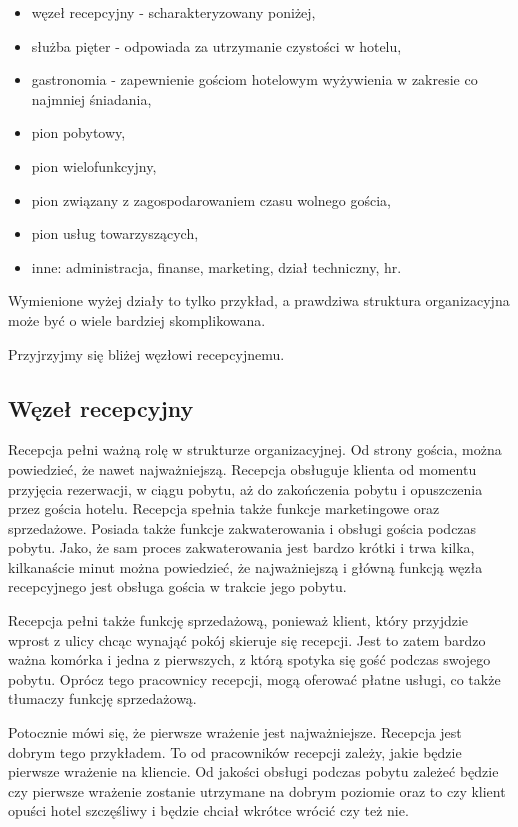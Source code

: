 \documentclass[a4paper,onecolumn,oneside,11pt,wide,floatssmall]{mwrep}
\theoremstyle{definition}
\theoremstyle{plain}%
\theoremstyle{remark}
\begin{document}
\begin{itemize}
  \item węzeł recepcyjny - scharakteryzowany poniżej,
  \item służba pięter - odpowiada za utrzymanie czystości w hotelu,
  \item gastronomia - zapewnienie gościom hotelowym wyżywienia w zakresie co najmniej śniadania,
  \item pion pobytowy,
  \item pion wielofunkcyjny,
  \item pion związany z zagospodarowaniem czasu wolnego gościa,
  \item pion usług towarzyszących,
  \item inne: administracja, finanse, marketing, dział techniczny, hr.
\end{itemize}

Wymienione wyżej działy to tylko przykład, a prawdziwa struktura 
organizacyjna może być o wiele bardziej skomplikowana.

Przyjrzyjmy się bliżej węzłowi recepcyjnemu.

\subsection{Węzeł recepcyjny}
Recepcja pełni ważną rolę w strukturze organizacyjnej. Od strony gościa, można powiedzieć, że nawet najważniejszą. 
Recepcja obsługuje klienta od momentu przyjęcia rezerwacji, w ciągu pobytu, aż do zakończenia pobytu i opuszczenia przez gościa hotelu. Recepcja spełnia także funkcje marketingowe 
oraz sprzedażowe. Posiada także funkcje zakwaterowania i obsługi gościa 
podczas pobytu. Jako, że sam proces zakwaterowania jest bardzo krótki i trwa kilka, kilkanaście minut można powiedzieć, że najważniejszą i główną funkcją węzła recepcyjnego jest obsługa gościa w trakcie jego pobytu.

Recepcja pełni także funkcję sprzedażową, ponieważ klient, 
który przyjdzie wprost z ulicy chcąc wynająć pokój skieruje się recepcji. 
Jest to zatem  bardzo ważna komórka i jedna z pierwszych, z którą spotyka 
się gość podczas swojego pobytu. Oprócz tego pracownicy recepcji, mogą oferować płatne usługi, co także tłumaczy funkcję sprzedażową.

Potocznie mówi się, że pierwsze wrażenie jest najważniejsze. Recepcja jest dobrym tego przykładem. To od pracowników recepcji zależy, jakie będzie pierwsze wrażenie na kliencie. Od jakości obsługi podczas pobytu zależeć będzie czy pierwsze wrażenie zostanie utrzymane na dobrym poziomie oraz to czy klient opuści hotel szczęśliwy i będzie chciał wkrótce wrócić czy też nie.
\end{document}

